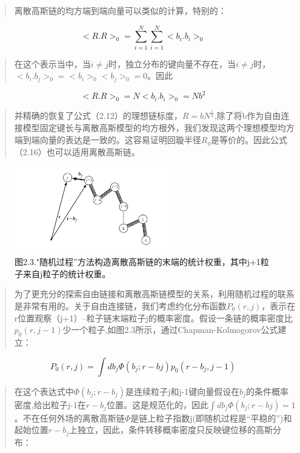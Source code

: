 \begin{quotation}
离散高斯链的均方端到端向量可以类似的计算，特别的：
\end{quotation}
\begin{equation}
<R.R>_{0}=\sum_{i=1}^{N}\sum_{i=1}^{N}<b_{i}.b_{i}>_{0}
\end{equation}
\begin{quotation}
在这个表示当中，当$i\neq j$时，独立分布的键向量不存在，当$i\neq j$时，$<b_{i}.b_{j}>_{0}=<b_{i}>_{0}<b_{j}>_{0}=0$。因此
\end{quotation}
\begin{equation}
<R.R>_{0}=N<b_{i}.b_{i}>_{0}=Nb^2
\end{equation}
\begin{quotation}
并精确的恢复了公式（2.12）的理想链标度，$R=bN^\frac{1}{2}$,除了将b作为自由连接模型固定键长与离散高斯模型的均方根外，我们发现这两个理想模型均方端到端向量的表达是一致的。这容易证明回璇半径$R_{g}$是等价的。因此公式（2.16）也可以适用离散高斯链。
\end{quotation}
\begin{figure}[h]
\centering
\includegraphics[width=7cm]{./figures/23.png}
\caption{图2.3."随机过程”方法构造离散高斯链的末端的统计权重，其中j+1粒子来自j粒子的统计权重。}
\end{figure}
\newpage
\begin{quotation}
为了更充分的探索自由链接和离散高斯链模型的关系，利用随机过程的联系是非常有用的。关于自由连接链，我们考虑约化分布函数$P_{0}(r,j)$，表示在r位置观察（j+1）--粒子链末端粒子j的概率密度。假设一条链的概率密度比$p_{0}(r,j-1)$少一个粒子,如图2.3所示，通过Chapman-Kolmogorov公式建立：
\end{quotation}
\begin{equation}
P_{0}(r,j)=\int db_{j} \varPhi (b_{j};r-b{j})p_{0}(r-b_{j},j-1)
\end{equation}
\begin{quotation}
在这个表达式中$\varPhi (b_{j};r-b_{j})$是连续粒子j和j-1键向量假设在$b_{j}$的条件概率密度,给出粒子j-1在$r-b_{j}$位置。这是规范化的，因此$\int db_{j} \varPhi (b_{j};r-b{j})=1$。不在任何外场的离散高斯链$\varPhi$是链上粒子指数j(即随机过程是“平稳的”)和起始位置$r-b_{j}$上独立，因此，条件转移概率密度只反映键位移的高斯分布：
\end{quotation}
